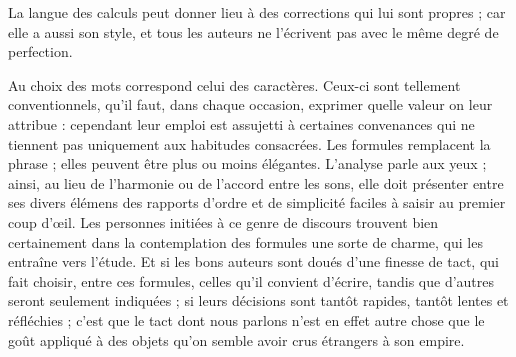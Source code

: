 \documentclass[11pt,a4paper]{article}
\begin{document}

La langue des calculs peut donner lieu à des  corrections
 qui lui sont propres ; car elle a aussi son style, et tous
les auteurs ne l'écrivent pas avec le même degré de perfection.



Au choix des mots correspond celui des caractères.  Ceux-ci
sont tellement conventionnels, qu'il faut, dans chaque occasion,
 exprimer quelle valeur on leur attribue : cependant leur emploi
est assujetti à certaines convenances qui ne tiennent pas uniquement aux
habitudes consacrées. Les formules remplacent la phrase ; elles peuvent être
plus ou moins élégantes. L'analyse parle aux yeux ; ainsi, au lieu de l'harmonie
ou de l'accord entre les sons, elle  doit présenter
entre ses divers élémens des rapports d'ordre et de simplicité faciles à saisir
au premier coup d'œil.  Les personnes
 initiées à ce genre de discours  trouvent bien certainement dans la
contemplation des formules une sorte  de charme, qui les entraîne
vers l'étude.  Et si les bons auteurs sont doués d'une
finesse de tact, qui   fait
choisir,  entre ces formules, celles qu'il convient
d'écrire, tandis que d'autres seront seulement indiquées ;  si leurs
décisions sont  tantôt rapides, tantôt lentes  et
réfléchies ; c'est que le tact dont nous parlons n'est en effet autre chose que
le goût  appliqué à des  objets
qu'on semble avoir crus étrangers à son empire.

\end{document}

